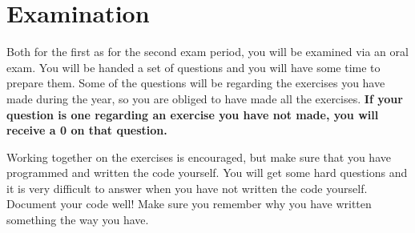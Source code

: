 \section{Examination}
Both for the first as for the second exam period, you will be examined via an oral exam. You will be handed a set of questions and  you will have some time to prepare them. Some of the questions will be regarding the exercises you have made during the year, so you are obliged to have made all the exercises. \textbf{If your question is one regarding an exercise you have not made, you will receive a 0 on that question.}

Working together on the exercises is encouraged, but make sure that you have programmed and written the code yourself. You will get some hard questions and it is very difficult to answer when you have not written the code yourself.
Document your code well! Make sure you remember why you have written something the way you have.

